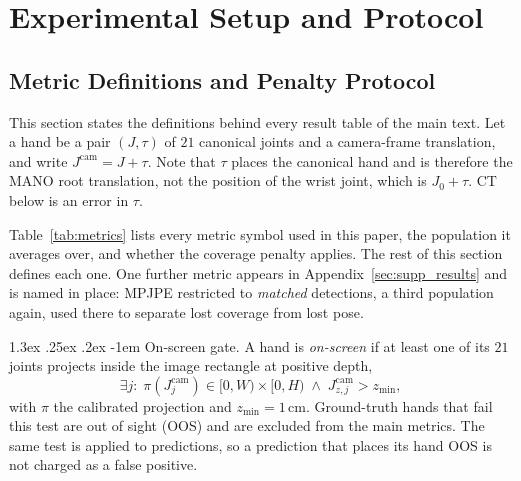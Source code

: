 \documentclass[10pt,twocolumn,letterpaper]{article}
\makeatletter
\renewcommand\paragraph{\@startsection{paragraph}{4}{\z@}%
  {1.3ex \@plus .25ex \@minus .2ex}%
  {-1em}%
  {\normalfont\normalsize\bfseries}}
\makeatother
\begin{document}
\section{Experimental Setup and Protocol}
\label{sec:supp_protocol}
\subsection{Metric Definitions and Penalty Protocol}
This section states the definitions behind every result table of the main text. Let a hand be a pair $(J,\tau)$ of $21$ canonical joints and a camera-frame translation, and write $J^{\mathrm{cam}}=J+\tau$. Note that $\tau$ places the canonical hand and is therefore the MANO root translation, not the position of the wrist joint, which is $J_0+\tau$. CT below is an error in $\tau$.

Table~\ref{tab:metrics} lists every metric symbol used in this paper, the population it averages over, and whether the coverage penalty applies. The rest of this section defines each one. One further metric appears in Appendix~\ref{sec:supp_results} and is named in place: MPJPE restricted to \emph{matched} detections, a third population again, used there to separate lost coverage from lost pose.

\paragraph{On-screen gate.} A hand is \emph{on-screen} if at least one of its $21$ joints projects inside the image rectangle at positive depth,
\begin{equation}
\exists j:\; \pi(J^{\mathrm{cam}}_j)\in[0,W)\times[0,H) \;\wedge\; J^{\mathrm{cam}}_{z,j}>z_{\min},
\end{equation}
with $\pi$ the calibrated projection and $z_{\min}=1$\,cm. Ground-truth hands that fail this test are out of sight (OOS) and are excluded from the main metrics. The same test is applied to predictions, so a prediction that places its hand OOS is not charged as a false positive.
\end{document}
